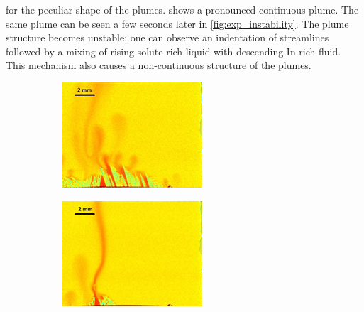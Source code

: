 for the peculiar shape of the plumes.  shows a pronounced continuous plume. The same plume can be seen a few seconds 
later in \cref{fig:exp_instability}. The plume structure becomes unstable; one can observe an indentation of streamlines followed by a mixing of 
rising solute-rich liquid with descending In-rich fluid. This mechanism also causes a non-continuous structure of the plumes.
%
\begin{figure}[htbp]
\centering
  \begin{subfigure}{0.3\textwidth}
    \centering
	\includegraphics[width=\textwidth]{Chapter3/Graphics/freckle_exp/exp_pulsing.png}
	\caption{}
    \label{fig:exp_pulsing}
  \end{subfigure}
  \begin{subfigure}{0.3\textwidth}
    \centering
	\includegraphics[width=\textwidth]{Chapter3/Graphics/freckle_exp/exp_continuous.png}

\end{subfigure}
\end{figure}
